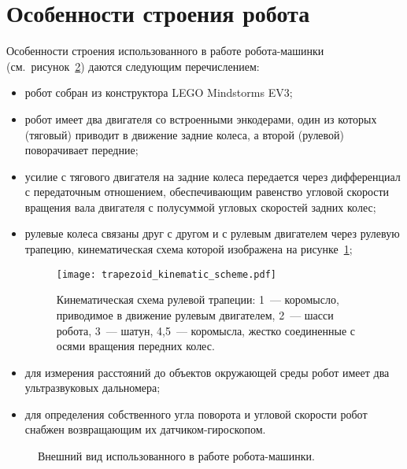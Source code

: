 \newpage
\section{Особенности строения робота}
Особенности строения использованного в работе робота-машинки (см.~рисунок~\ref{img_robot_gen_view}) даются следующим перечислением:
\begin{itemize}
    \item робот собран из конструктора LEGO Mindstorms EV3;
    \item робот имеет два двигателя со встроенными энкодерами, один из которых (тяговый) приводит в движение задние колеса, а второй (рулевой) поворачивает передние;
    \item усилие с тягового двигателя на задние колеса передается через дифференциал с передаточным отношением, обеспечивающим равенство угловой скорости вращения вала двигателя с полусуммой угловых скоростей задних колес;
    \item рулевые колеса связаны друг с другом и с рулевым двигателем через рулевую трапецию, кинематическая схема которой изображена на рисунке~\ref{img_trapezoid_scheme};
    \begin{figure}[h]
        \centering
        \texttt{[image: trapezoid\_kinematic\_scheme.pdf]}
        \caption{Кинематическая схема рулевой трапеции: 1~--- коромысло, приводимое в движение рулевым двигателем, 2~--- шасси робота, 3~--- шатун, 4,5~--- коромысла, жестко соединенные с осями вращения передних колес.}
        \label{img_trapezoid_scheme}
    \end{figure}
    \item для измерения расстояний до объектов окружающей среды робот имеет два ультразвуковых дальномера;
    \item для определения собственного угла поворота и угловой скорости робот снабжен возвращающим их датчиком-гироскопом.
\end{itemize}

\begin{figure}[h!]
    \begin{minipage}[h]{0.47\textwidth}
    \end{minipage}
    \hfill
    \begin{minipage}[h]{0.47\textwidth}
    \end{minipage}
    \vfill
    \begin{minipage}[h]{0.47\textwidth}
    \end{minipage}
    \hfill
    \begin{minipage}[h]{0.47\textwidth}
    \end{minipage}
    \caption{Внешний вид использованного в работе робота-машинки.}
    \label{img_robot_gen_view}
\end{figure}

\newpage
\mbox{}
